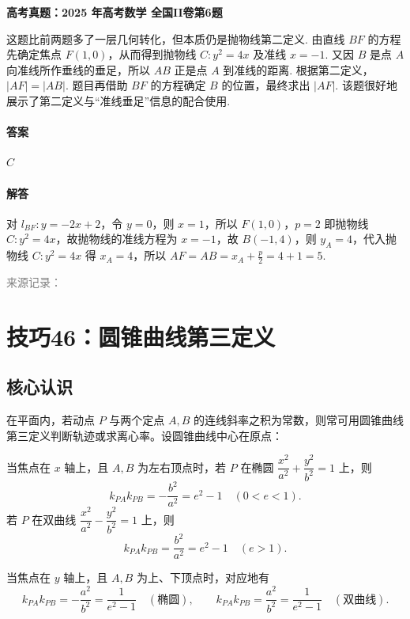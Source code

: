 \documentclass[UTF8,a4paper,11pt]{ctexart}
\newenvironment{gaokao}[1]{\par\medskip\noindent\textbf{高考真题：#1}\par\smallskip}{\par\medskip}
\begin{document}
\begin{gaokao}{2025 年高考数学 全国II卷第6题}
这题比前两题多了一层几何转化，但本质仍是抛物线第二定义. 由直线 $BF$ 的方程先确定焦点 $F(1,0)$，从而得到抛物线 $C:y^2=4x$ 及准线 $x=-1$. 又因 $B$ 是点 $A$ 向准线所作垂线的垂足，所以 $AB$ 正是点 $A$ 到准线的距离. 根据第二定义，$|AF|=|AB|$. 题目再借助 $BF$ 的方程确定 $B$ 的位置，最终求出 $|AF|$. 该题很好地展示了第二定义与“准线垂足”信息的配合使用.

\paragraph{答案}

$C$

\paragraph{解答}

对 $l_{BF}:y=-2x+2$，令 $y=0$，则 $x=1$，所以 $F(1,0)$，$p=2$ 即抛物线 $C:y^2=4x$，故抛物线的准线方程为 $x=-1$，故 $B(-1,4)$，则 $y_A=4$，代入抛物线 $C:y^2=4x$ 得 $x_A=4$，所以 $AF=AB=x_A+\frac{p}{2}=4+1=5$.

\par\smallskip\textcolor{gray}{\footnotesize 来源记录：\texttt{}}

\end{gaokao}

\clearpage

\section{技巧46：圆锥曲线第三定义}

\subsection*{核心认识}

在平面内，若动点 $P$ 与两个定点 $A,B$ 的连线斜率之积为常数，则常可用圆锥曲线第三定义判断轨迹或求离心率。设圆锥曲线中心在原点：

当焦点在 $x$ 轴上，且 $A,B$ 为左右顶点时，若 $P$ 在椭圆 $\dfrac{x^2}{a^2}+\dfrac{y^2}{b^2}=1$ 上，则
\[
k_{PA}k_{PB}=-\frac{b^2}{a^2}=e^2-1\quad(0<e<1).
\]
若 $P$ 在双曲线 $\dfrac{x^2}{a^2}-\dfrac{y^2}{b^2}=1$ 上，则
\[
k_{PA}k_{PB}=\frac{b^2}{a^2}=e^2-1\quad(e>1).
\]

当焦点在 $y$ 轴上，且 $A,B$ 为上、下顶点时，对应地有
\[
k_{PA}k_{PB}=-\frac{a^2}{b^2}=\frac{1}{e^2-1}\quad(\text{椭圆}),
\qquad
k_{PA}k_{PB}=\frac{a^2}{b^2}=\frac{1}{e^2-1}\quad(\text{双曲线}).
\]
\end{document}
